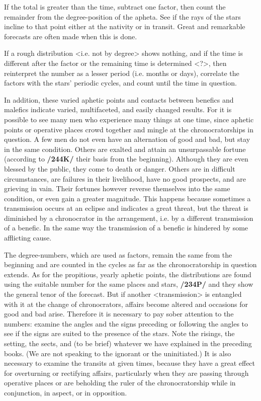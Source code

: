 If the total is greater than the time, subtract one factor, then count the remainder from the degree-position of the apheta. See if the rays of the stars incline to that point either at the nativity or in transit. Great and remarkable forecasts are often made when this is done. 

If a rough distribution <i.e. not by degree> shows nothing, and if the time is different after the factor or the remaining time is determined <?>, then reinterpret the number as a lesser period (i.e. months or days), correlate the factors with the stars’ periodic cycles, and count until the time in question.

In addition, these varied aphetic points and contacts between benefics and malefics indicate varied, multifaceted, and easily changed results. For it is possible to see many men who experience many things at one time, since aphetic points or operative places crowd together and mingle at the chronocratorships in question. A few men do not even have an alternation of good and bad, but stay in the same condition.
Others are exalted and attain an unsurpassable fortune (according to \textbf{/244K/} their basis from the beginning). Although they are even blessed by the public, they come to death or danger. Others are in difficult circumstances, are failures in their livelihood, have no good prospects, and are grieving in vain. Their fortunes however reverse themselves into the same condition, or even gain a greater magnitude. This happens because sometimes a transmission occurs at an eclipse and indicates a great threat, but the threat is diminished by a chronocrator in the arrangement, i.e. by a different transmission of a benefic. In the same way the transmission of a benefic is hindered by some afflicting cause.

The degree-numbers, which are used as factors, remain the same from the beginning and are counted in the cycles as far as the chronocratorship in question extends. As for the propitious, yearly aphetic points, the distributions are found using the suitable number for the same places and stars, \textbf{/234P/} and they show
the general tenor of the forecast. But if another <transmission> is entangled with it at the change of chronocrators, affairs become altered and occasions for good and bad arise. \mndl Therefore it is necessary to pay sober attention to the numbers: examine the angles and the signs preceding or following the angles to see if the signs are suited to the presence of the stars. Note the risings, the setting, the sects, and (to be brief) whatever we have explained in the preceding books. (We are not speaking to the ignorant or the uninitiated.) It is also necessary to examine the transits at given times, because they have a great effect for overturning or rectifying affairs, particularly when they are passing through operative places or are beholding the ruler of the chronocratorship while in conjunction, in aspect, or in opposition.

